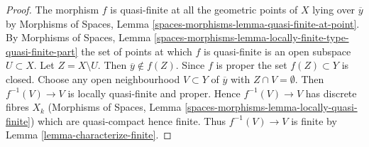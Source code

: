 \begin{proof}
The morphism $f$ is quasi-finite at all the geometric points of $X$
lying over $\overline{y}$ by
Morphisms of Spaces, Lemma \ref{spaces-morphisms-lemma-quasi-finite-at-point}.
By Morphisms of Spaces, Lemma
\ref{spaces-morphisms-lemma-locally-finite-type-quasi-finite-part} the
set of points at which $f$ is quasi-finite is an open subspace $U \subset X$.
Let $Z = X \setminus U$. Then $\overline{y} \not \in f(Z)$. Since $f$
is proper the set $f(Z) \subset Y$ is closed. Choose any open neighbourhood
$V \subset Y$ of $\overline{y}$ with $Z \cap V = \emptyset$. Then
$f^{-1}(V) \to V$ is locally quasi-finite and proper.
Hence $f^{-1}(V) \to V$ has discrete fibres $X_k$
(Morphisms of Spaces, Lemma
\ref{spaces-morphisms-lemma-locally-quasi-finite})
which are quasi-compact hence finite.
Thus $f^{-1}(V) \to V$
is finite by Lemma \ref{lemma-characterize-finite}.
\end{proof}










